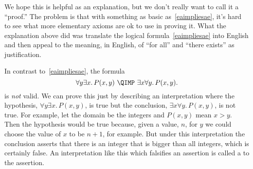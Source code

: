 We hope this is helpful as an explanation, but we don't really want to
call it a ``proof.''  The problem is that with something as basic
as~\eqref{eaimpliesae}, it's hard to see what more elementary axioms
are ok to use in proving it.  What the explanation above did was
translate the logical formula~\eqref{eaimpliesae} into English and
then appeal to the meaning, in English, of ``for all'' and ``there
exists'' as justification.

\iffalse
So this wasn't a proof, just an explanation intended to make 
what~\eqref{eaimpliesae} means, it becomes obvious.
\fi

In contrast to~\eqref{eaimpliesae}, the formula
\begin{equation}\label{aenotimplyea}
\forall y \exists x.\, P(x,y)\ \QIMP\ \exists x \forall y.\, P(x,y).
\end{equation}
is \emph{not} valid.  We can prove this just by describing an
interpretation where the hypothesis, $\forall y \exists x.\, P(x,y)$, is
true but the conclusion, $\exists x \forall y.\, P(x,y)$, is not true.
For example, let the domain be the integers and $P(x,y)$ mean $x > y$.
Then the hypothesis would be true because, given a value, $n$, for $y$ we
could choose the value of $x$ to be $n+1$, for example.  But under this
interpretation the conclusion asserts that there is an integer that is
bigger than all integers, which is certainly false.  An interpretation
like this which falsifies an assertion is called a  to
the assertion.

\begin{problems}

\practiceproblems
{}

\classproblems
{}

\homeworkproblems
{}

\examproblems
{}

\end{problems}

\iffalse
\section{Rules for Quantifiers}

\subsection{Prenex Form}
\fi

\endinput
